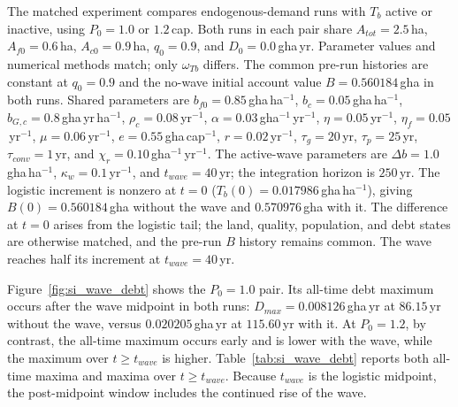 \documentclass[11pt,a4paper]{article}
\begin{document}
The matched experiment compares endogenous-demand runs with $T_b$ active or inactive, using $P_0=1.0$ or $1.2$\,cap. Both runs in each pair share $A_{tot}=2.5$\,ha, $A_{f0}=0.6$\,ha, $A_{c0}=0.9$\,ha, $q_0=0.9$, and $D_0=0.0$\,gha\,yr. Parameter values and numerical methods match; only $\omega_{Tb}$ differs. The common pre-run histories are constant at $q_0=0.9$ and the no-wave initial account value $B=0.560184$\,gha in both runs. Shared parameters are $b_{f0}=0.85$\,gha\,ha$^{-1}$, $b_c=0.05$\,gha\,ha$^{-1}$, $b_{G,c}=0.8$\,gha\,yr\,ha$^{-1}$, $\rho_c=0.08$\,yr$^{-1}$, $\alpha=0.03$\,gha$^{-1}$\,yr$^{-1}$, $\eta=0.05$\,yr$^{-1}$, $\eta_f=0.05$\,yr$^{-1}$, $\mu=0.06$\,yr$^{-1}$, $e=0.55$\,gha\,cap$^{-1}$, $r=0.02$\,yr$^{-1}$, $\tau_g=20$\,yr, $\tau_p=25$\,yr, $\tau_{conv}=1$\,yr, and $\chi_r=0.10$\,gha$^{-1}$\,yr$^{-1}$. The active-wave parameters are $\Delta b=1.0$\,gha\,ha$^{-1}$, $\kappa_w=0.1$\,yr$^{-1}$, and $t_{wave}=40$\,yr; the integration horizon is $250$\,yr. The logistic increment is nonzero at $t=0$ ($T_b(0)=0.017986$\,gha\,ha$^{-1}$), giving $B(0)=0.560184$\,gha without the wave and $0.570976$\,gha with it. The difference at $t=0$ arises from the logistic tail; the land, quality, population, and debt states are otherwise matched, and the pre-run $B$ history remains common. The wave reaches half its increment at $t_{wave}=40$\,yr.

Figure~\ref{fig:si_wave_debt} shows the $P_0=1.0$ pair. Its all-time debt maximum occurs after the wave midpoint in both runs: $D_{max}=0.008126$\,gha\,yr at $86.15$\,yr without the wave, versus $0.020205$\,gha\,yr at $115.60$\,yr with it. At $P_0=1.2$, by contrast, the all-time maximum occurs early and is lower with the wave, while the maximum over $t\ge t_{wave}$ is higher. Table~\ref{tab:si_wave_debt} reports both all-time maxima and maxima over $t\ge t_{wave}$. Because $t_{wave}$ is the logistic midpoint, the post-midpoint window includes the continued rise of the wave.
\end{document}
